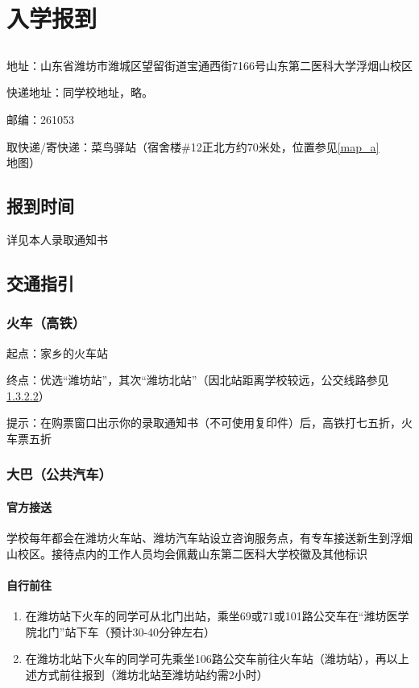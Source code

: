\chapter[入学报到]{入学报到}

\section[地址与快递（浮烟山校区）]{}
地址：山东省潍坊市潍城区望留街道宝通西街7166号山东第二医科大学浮烟山校区

快递地址：同学校地址，略。

邮编：261053

取快递/寄快递：菜鸟驿站（宿舍楼\#12正北方约70米处，位置参见\uline{\ref{map_a}}地图）

\section[报到时间]{报到时间}
详见本人录取通知书

\section[交通指引]{交通指引}
\subsection[火车（高铁）]{火车（高铁）}
起点：家乡的火车站

终点：优选“潍坊站”，其次“潍坊北站”（因北站距离学校较远，公交线路参见\uline{\ref{bus}}）

提示：在购票窗口出示你的录取通知书（不可使用复印件）后，高铁打七五折，火车票五折

\subsection[大巴（公共汽车）]{大巴（公共汽车）}

\subsubsection[官方接送]{官方接送}
学校每年都会在潍坊火车站、潍坊汽车站设立咨询服务点，有专车接送新生到浮烟山校区。接待点内的工作人员均会佩戴山东第二医科大学校徽及其他标识

\subsubsection[自行前往]{自行前往}
\label{bus}
\begin{enumerate}
      \item 在潍坊站下火车的同学可从北门出站，乘坐69或71或101路公交车在“潍坊医学院北门”站下车（预计30-40分钟左右）
      \item 在潍坊北站下火车的同学可先乘坐106路公交车前往火车站（潍坊站），再以上述方式前往报到（潍坊北站至潍坊站约需2小时）
\end{enumerate}

